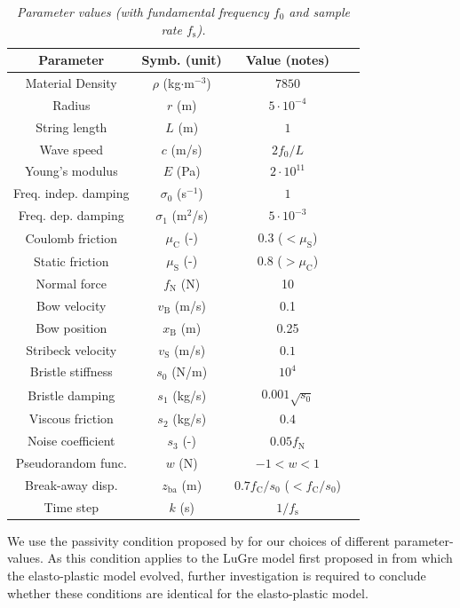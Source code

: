 \documentclass[twoside,a4paper,dvipsnames]{article}
\begin{document}
\begin{table}[ht]
  \caption{{\it Parameter values (with fundamental frequency $f_0$ and sample rate $f_\text{s}$).}}
	\centering
  \begin{tabular}{|c|c|c|c|}\hline
    Parameter & Symb. (unit) & Value (notes)\\ \hline
    Material Density &$\rho$ (kg$\cdot$m$^{-3}$) & $7850$ \\
    Radius & $r$ (m) & $5\cdot10^{-4}$\\
    String length & $L$ (m) & $1$\\
    Wave speed & $c$ (m/s) & $2 f_0/L$\\
    Young's modulus & $E$ (Pa) & $2\cdot 10^{11}$\\
    Freq. indep. damping & $\sigma_0$ (s$^{-1}$) & $1$\\
    Freq. dep. damping & $\sigma_1$ (m$^{2}$/s) & $5 \cdot 10^{-3}$\\
    Coulomb friction & $\mu_\text{C}$ (-) & $0.3$ ($<\mu_\text{S}$) \\
    Static friction & $\mu_\text{S}$ (-) & $0.8$ ($>\mu_\text{C}$) \\
    Normal force & $f_\text{N}$ (N) & 10 \\
    Bow velocity & $v_\text{B}$ (m/s) & 0.1 \\
    Bow position & $x_\text{B}$ (m) & 0.25 \\
    Stribeck velocity & $v_\text{S}$ (m/s) & $0.1$ \\
    Bristle stiffness & $s_0$ (N/m)& $10^4$ \\
    Bristle damping & $s_1$ (kg/s)& $0.001\sqrt{s_0}$ \\
    Viscous friction & $s_2$ (kg/s) & $0.4$ \\
    Noise coefficient & $s_3$ (-) & $0.05f_\text{N}$\\
    Pseudorandom func. & $w$ (N) & $-1<w<1$\\
    Break-away disp.& $z_\text{ba}$ (m) & $0.7 f_\text{C}/s_0$ ($<f_\text{C}/s_0$) \\
    Time step & $k$ (s) & $1/f_\text{s}$ \\
    \hline
 \end{tabular}
  \label{tab:parameters}
\end{table}
We use the passivity condition proposed by \cite{Astrom2008} for our choices of different parameter-values. As this condition applies to the LuGre model first proposed in \cite{Canudas1993, Canudas1995} from which the elasto-plastic model evolved, further investigation is required to conclude whether these conditions are identical for the elasto-plastic model.
\end{document}
